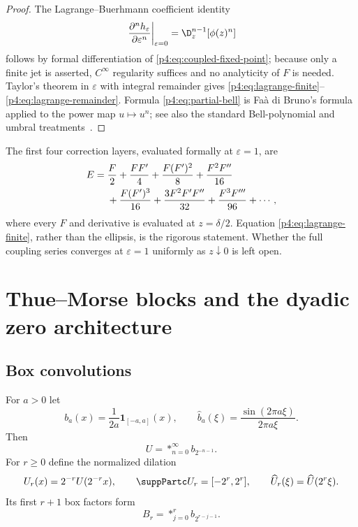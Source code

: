 \documentclass[11pt]{article}
\numberwithin{equation}{section}
\theoremstyle{definition}
\theoremstyle{remark}
\begin{document}
\begin{proof}
The Lagrange--Buerhmann coefficient identity
\[
 \left.\frac{\partial^n h_\varepsilon}{\partial\varepsilon^n}\right|_{\varepsilon=0}
 =\D_z^{n-1}[\phi(z)^n]
\]
follows by formal differentiation of \eqref{p4:eq:coupled-fixed-point}; because only a finite jet is asserted, $C^\infty$ regularity suffices and no analyticity of $F$ is needed.  Taylor's theorem in $\varepsilon$ with integral remainder gives \eqref{p4:eq:lagrange-finite}--\eqref{p4:eq:lagrange-remainder}.  Formula \eqref{p4:eq:partial-bell} is Fa\`a di Bruno's formula applied to the power map $u\mapsto u^n$; see also the standard Bell-polynomial and umbral treatments~\cite{p4:comtet,p4:roman}.
\end{proof}

The first four correction layers, evaluated formally at $\varepsilon=1$, are
\begin{align}
 E
={}&\frac F2+\frac{FF'}4
 +\frac{F(F')^2}{8}+\frac{F^2F''}{16}
 \notag\\
 &+\frac{F(F')^3}{16}
  +\frac{3F^2F'F''}{32}
  +\frac{F^3F'''}{96}+\cdots,
 \label{p4:eq:inverse-bell-first}
\end{align}
where every $F$ and derivative is evaluated at $z=\delta/2$.  Equation \eqref{p4:eq:lagrange-finite}, rather than the ellipsis, is the rigorous statement.  Whether the full coupling series converges at $\varepsilon=1$ uniformly as $z\downarrow0$ is left open.

\section{Thue--Morse blocks and the dyadic zero architecture}
\label{p4:sec:zero-architecture}

\subsection{Box convolutions}
For $a>0$ let
\begin{equation}
 b_a(x)=\frac1{2a}\mathbf1_{[-a,a]}(x),
 \qquad \widehat b_a(\xi)=\frac{\sin(2\pi a\xi)}{2\pi a\xi}.
 \label{p4:eq:box}
\end{equation}
Then
\begin{equation}
 U=*_{n=0}^{\infty}b_{2^{-n-1}}.
 \label{p4:eq:up-box-convolution}
\end{equation}
For $r\ge0$ define the normalized dilation
\begin{equation}
 U_r(x)=2^{-r}U(2^{-r}x),
 \qquad \suppPartc U_r=[-2^r,2^r],
 \qquad \widehat U_r(\xi)=\widehat U(2^r\xi).
 \label{p4:eq:Ur}
\end{equation}
Its first $r+1$ box factors form
\begin{equation}
 B_r=*_{j=0}^{r}b_{2^{r-j-1}}.
 \label{p4:eq:Br}
\end{equation}
\end{document}
